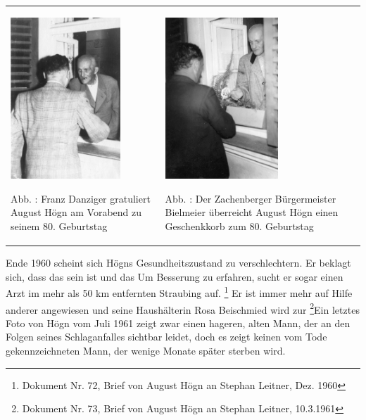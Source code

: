 \begin{center}
\begin{minipage}{9.146cm}
\begin{center}
\tablefirsthead{}
\tablehead{}
\tabletail{}
\tablelasttail{}
\begin{supertabular}{m{4.309cm}m{4.4370003cm}}

\includegraphics[width=4.128cm,height=6.071cm]{pictures/zulassungsarbeit-img054.jpg}

Abb. : Franz Danziger gratuliert August Högn
am Vorabend zu seinem 80. Geburtstag &

\includegraphics[width=4.255cm,height=6.073cm]{pictures/zulassungsarbeit-img055.jpg}

Abb. : Der Zachenberger Bürgermeister
Bielmeier überreicht August Högn einen Geschenkkorb zum 80.
Geburtstag\\
\end{supertabular}
\end{center}
\end{minipage}
\end{center}
Ende 1960 scheint sich Högns Gesundheitszustand zu verschlechtern. Er
beklagt sich, dass das sein  ist und das Um Besserung zu erfahren, sucht er sogar einen Arzt im
mehr als 50 km entfernten Straubing auf. \footnote{Dokument Nr. 72,
Brief von August Högn an Stephan Leitner, Dez. 1960} Er ist immer mehr
auf Hilfe anderer angewiesen und seine Haushälterin Rosa Beischmied
wird zur  \footnote{Dokument
Nr. 73, Brief von August Högn an Stephan Leitner,
10.3.1961}Ein letztes Foto von Högn vom Juli
1961 zeigt zwar einen hageren, alten Mann, der an den Folgen seines
Schlaganfalles sichtbar leidet, doch es zeigt keinen vom Tode
gekennzeichneten Mann, der wenige Monate später sterben wird.

